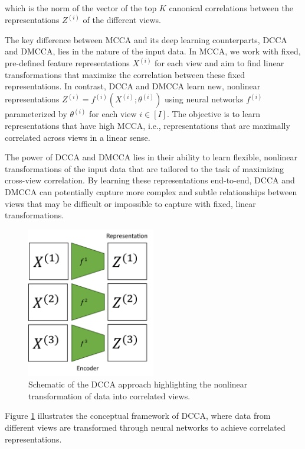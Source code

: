 which is the norm of the vector of the top $K$ canonical correlations between the representations $Z^{(i)}$ of the different views.

The key difference between MCCA and its deep learning counterparts, DCCA and DMCCA, lies in the nature of the input data. In MCCA, we work with fixed, pre-defined feature representations $X^{(i)}$ for each view and aim to find linear transformations that maximize the correlation between these fixed representations. In contrast, DCCA and DMCCA learn new, nonlinear representations $Z^{(i)} = f^{(i)}(X^{(i)}; \theta^{(i)})$ using neural networks $f^{(i)}$ parameterized by $\theta^{(i)}$ for each view $i \in [I]$. The objective is to learn representations that have high MCCA, i.e., representations that are maximally correlated across views in a linear sense.

The power of DCCA and DMCCA lies in their ability to learn flexible, nonlinear transformations of the input data that are tailored to the task of maximizing cross-view correlation. By learning these representations end-to-end, DCCA and DMCCA can potentially capture more complex and subtle relationships between views that may be difficult or impossible to capture with fixed, linear transformations.

\begin{figure}
\centering
\includegraphics[width=0.5\textwidth]{figures/dcca_schematic}
\caption{Schematic of the DCCA approach highlighting the nonlinear transformation of data into correlated views.}
\label{fig:dcca_schematic}
\end{figure}

Figure \ref{fig:dcca_schematic} illustrates the conceptual framework of DCCA, where data from different views are transformed through neural networks to achieve correlated representations.


